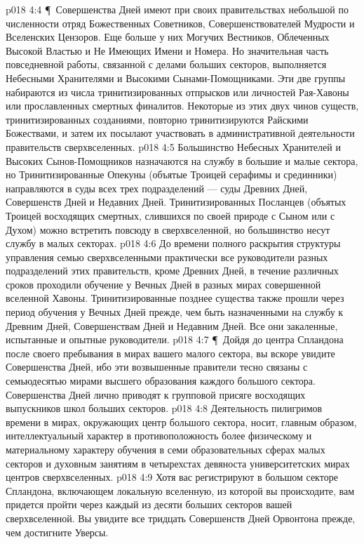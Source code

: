 \vs p018 4:4 \P\ Совершенства Дней имеют при своих правительствах небольшой по численности отряд Божественных Советников, Совершенствователей Мудрости и Вселенских Цензоров. Еще больше у них Могучих Вестников, Облеченных Высокой Властью и Не Имеющих Имени и Номера. Но значительная часть повседневной работы, связанной с делами больших секторов, выполняется Небесными Хранителями и Высокими Сынами\hyp{}Помощниками. Эти две группы набираются из числа тринитизированных отпрысков или личностей Рая\hyp{}Хавоны или прославленных смертных финалитов. Некоторые из этих двух чинов существ, тринитизированных созданиями, повторно тринитизируются Райскими Божествами, и затем их посылают участвовать в административной деятельности правительств сверхвселенных.
\vs p018 4:5 Большинство Небесных Хранителей и Высоких Сынов\hyp{}Помощников назначаются на службу в большие и малые сектора, но Тринитизированные Опекуны (объятые Троицей серафимы и срединники) направляются в суды всех трех подразделений --- суды Древних Дней, Совершенств Дней и Недавних Дней. Тринитизированных Посланцев (объятых Троицей восходящих смертных, слившихся по своей природе с Сыном или с Духом) можно встретить повсюду в сверхвселенной, но большинство несут службу в малых секторах.
\vs p018 4:6 До времени полного раскрытия структуры управления семью сверхвселенными практически все руководители разных подразделений этих правительств, кроме Древних Дней, в течение различных сроков проходили обучение у Вечных Дней в разных мирах совершенной вселенной Хавоны. Тринитизированные позднее существа также прошли через период обучения у Вечных Дней прежде, чем быть назначенными на службу к Древним Дней, Совершенствам Дней и Недавним Дней. Все они закаленные, испытанные и опытные руководители.
\vs p018 4:7 \P\ Дойдя до центра Спландона после своего пребывания в мирах вашего малого сектора, вы вскоре увидите Совершенства Дней, ибо эти возвышенные правители тесно связаны с семьюдесятью мирами высшего образования каждого большого сектора. Совершенства Дней лично приводят к групповой присяге восходящих выпускников школ больших секторов.
\vs p018 4:8 Деятельность пилигримов времени в мирах, окружающих центр большого сектора, носит, главным образом, интеллектуальный характер в противоположность более физическому и материальному характеру обучения в семи образовательных сферах малых секторов и духовным занятиям в четырехстах девяноста университетских мирах центров сверхвселенных.
\vs p018 4:9 Хотя вас регистрируют в большом секторе Спландона, включающем локальную вселенную, из которой вы происходите, вам придется пройти через каждый из десяти больших секторов вашей сверхвселенной. Вы увидите все тридцать Совершенств Дней Орвонтона прежде, чем достигните Уверсы.

